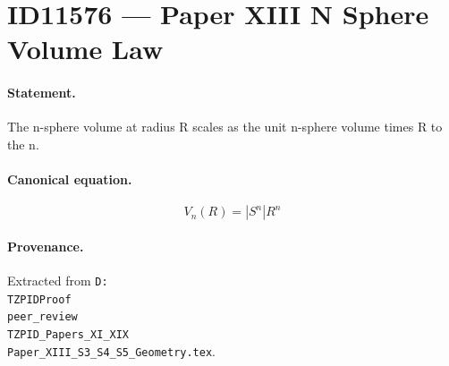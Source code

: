 \section*{ID11576 --- Paper XIII N Sphere Volume Law}

\paragraph{Statement.}
The n-sphere volume at radius R scales as the unit n-sphere volume times R to the n.

\paragraph{Canonical equation.}
\[
V_n(R)=|S^n|R^n
\]

\paragraph{Provenance.}
Extracted from \texttt{D:\\TZPIDProof\\peer\_review\\TZPID\_Papers\_XI\_XIX\\Paper\_XIII\_S3\_S4\_S5\_Geometry.tex}.
